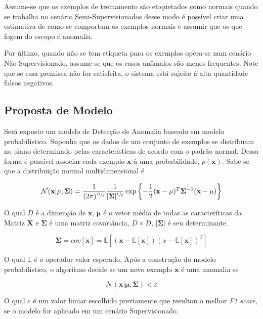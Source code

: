 Assume-se que os exemplos de treinamento são etiquetados como normais quando se trabalha no cenário Semi-Supervisionados desse modo é possível criar uma estimativa de como se comportam os exemplos normais e assumir que os que fogem do escopo é anomalia.

Por último, quando não se tem etiqueta para os exemplos opera-se num cenário Não Supervisionado, assume-se que os casos anômalos são menos frequentes. Note que se essa premissa não for satisfeita, o sistema está sujeito à alta quantidade falsos negativos.

\subsection{Proposta de Modelo}

Será exposto um modelo de Detecção de Anomalia baseado em modelo probabilístico. Suponha que os dados de um conjunto de exemplos se distribuam no plano determinado pelas características de acordo com o padrão normal. Dessa forma é possível associar cada exemplo \(\mathbf{x}\) à uma probabilidade, \(p(\mathbf{x})\).
Sabe-se\cite{bishop2006pattern} que a distribuição normal multidimensional é

\[\mathcal{N}(\mathbf{x}|\mathbf{\mu},\mathbf{\Sigma})=\frac{1}{(2\pi)^{\sfrac{D}{2}}} \frac{1}{|\mathbf{\Sigma}|^{\sfrac{1}{2}}}\exp\left\{ -\frac{1}{2} (\mathbf{x} - \mathbf{\mu})^T \mathbf{\Sigma}^{-1} (\mathbf{x} - \mathbf{\mu}) \right\}\]

O qual \(D\) é a dimenção de \(\mathbf{x}\), \(\mathbf{\mu}\) é o vetor média de todas as caracteríticas da Matriz \(\mathbf{X}\) e \(\mathbf{\Sigma}\) é uma matriz covariância, \(D \times D\), \(|\mathbf{\Sigma}|\) é seu determinante.

\[\mathbf{\Sigma}=\mathit{cov}[ \mathbf{x} ] = \mathbb{E} \left \lbrack ( \mathbf{x} - \mathbb{E} [ \mathbf{x} ] ) ( x - \mathbb{E} [ \mathbf{x} ] ) ^ T \right \rbrack \]

O qual \(\mathbb{E}\) é o operador valor esperado. Após a construção do modelo probabilístico, o algoritmo decide se um novo exemplo \(\mathbf{x}\) é uma anomalia se

\[\mathcal{N}(\mathbf{x}|\mathbf{\mu},\mathbf{\Sigma}) < \varepsilon\]

O qual \(\varepsilon\) é um valor limiar escolhido previamente que resultou o melhor \textit{F1 score}, se o modelo for aplicado em um cenário Supervisionado.

